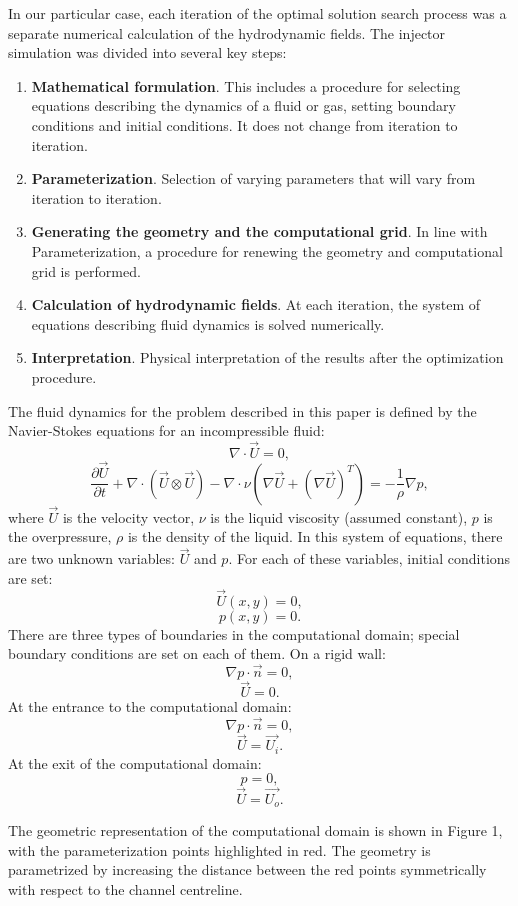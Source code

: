 \documentclass{aip-cp}
\begin{document}
In our particular case, each iteration of the optimal solution search process was a separate numerical calculation of the hydrodynamic fields. The injector simulation was divided into several key steps:
\begin{enumerate}
\item \textbf{Mathematical formulation}. This includes a procedure for selecting equations describing the dynamics of a fluid or gas, setting boundary conditions and initial conditions. It does not change from iteration to iteration.
\item \textbf{Parameterization}. Selection of varying parameters that will vary from iteration to iteration.
\item \textbf{Generating the geometry and the computational grid}. In line with Parameterization, a procedure for renewing the geometry and computational grid is performed.
\item \textbf{Calculation of hydrodynamic fields}. At each iteration, the system of equations describing fluid dynamics is solved numerically.
\item \textbf{Interpretation}. Physical interpretation of the results after the optimization procedure.
\end{enumerate}

The fluid dynamics for the problem described in this paper is defined by the Navier-Stokes equations for an incompressible fluid:
\[
\nabla \cdot \vec{U} = 0,
\]
\[
\frac{\partial \vec{U}}{\partial t} + \nabla \cdot \left( \vec{U} \otimes \vec{U}\right) - \nabla \cdot \nu \left( \nabla \vec{U} + (\nabla \vec{U})^T\right) = - \frac{1}{\rho} \nabla p,
\]
where $\vec{U}$ is the velocity vector, $\nu$  is the liquid viscosity (assumed constant), $p$  is the overpressure, $\rho$ is the density of the liquid. In this system of equations, there are two unknown variables: $\vec{U}$  and $p$. For each of these variables, initial conditions are set: 
\[
\vec{U}(x,y) = 0,
\]
\[
p(x,y) = 0.
\]
There are three types of boundaries in the computational domain; special boundary conditions are set on each of them. 
On a rigid wall:
\[
\nabla p \cdot \vec{n} = 0,
\]
\[
\vec{U} = 0.
\]
At the entrance to the computational domain:
\[
\nabla p \cdot \vec{n} = 0,
\]
\[
\vec{U} = \vec{U_i}.
\]
At the exit of the computational domain:
\[
 p = 0,
\]
\[
\vec{U} = \vec{U_o}.
\]

The geometric representation of the computational domain is shown in Figure 1, with the parameterization points highlighted in red. The geometry is parametrized by increasing the distance between the red points symmetrically with respect to the channel centreline. 
\end{document}
